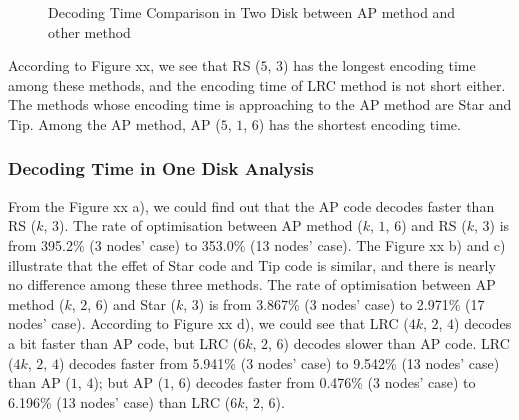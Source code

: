 \documentclass[sigconf]{acmart}
\begin{document}
\begin{figure}[]
\caption{Decoding Time Comparison in Two Disk between AP method and other method}\label{fig-decoding-2}
\end{figure}

According to Figure xx, we see that RS ($5$, $3$) has the longest encoding time among these methods, and the encoding time of LRC method is not short either. The methods whose encoding time is approaching to the AP method are Star and Tip. Among the AP method, AP ($5$, $1$, $6$) has the shortest encoding time.\par


\subsubsection{Decoding Time in One Disk Analysis}
From the Figure xx a), we could find out that the AP code decodes faster than RS ($k$, $3$). The rate of optimisation between AP method ($k$, $1$, $6$) and RS ($k$, $3$) is from 395.2\% (3 nodes’ case) to 353.0\% (13 nodes’ case). The Figure xx b) and c) illustrate that the effet of Star code and Tip code is similar, and there is nearly no difference among these three methods. The rate of optimisation between AP method ($k$, $2$, $6$) and Star ($k$, $3$) is from 3.867\% (3 nodes’ case) to 2.971\% (17 nodes’ case). According to Figure xx d), we could see that LRC ($4k$, $2$, $4$) decodes a bit faster than AP code, but LRC ($6k$, $2$, $6$) decodes slower than AP code. LRC ($4k$, $2$, $4$) decodes faster from 5.941\% (3 nodes’ case) to 9.542\% (13 nodes’ case) than AP ($1$, $4$); but AP ($1$, $6$) decodes faster from 0.476\% (3 nodes’ case) to 6.196\% (13 nodes’ case) than LRC ($6k$, $2$, $6$).\par
\end{document}

